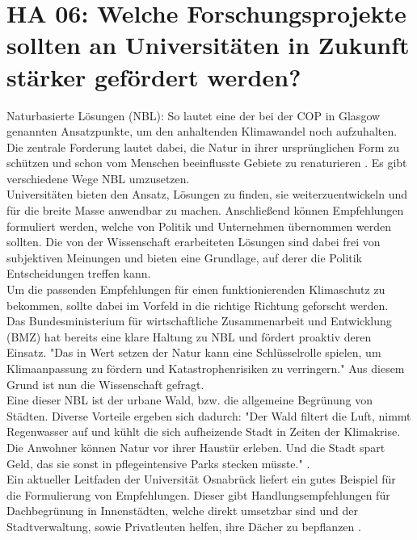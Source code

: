 \section{HA 06: Welche Forschungsprojekte sollten an Universitäten in Zukunft stärker gefördert werden?}
  Naturbasierte Lösungen (NBL): So lautet eine der bei der COP in Glasgow genannten Ansatzpunkte, um den anhaltenden Klimawandel noch aufzuhalten. Die zentrale Forderung lautet dabei, die Natur in ihrer ursprünglichen Form zu schützen und schon vom Menschen beeinflusste Gebiete zu renaturieren \cite{wahnbaeck_nature-based_2021}. Es gibt verschiedene Wege NBL umzusetzen.\\
  Universitäten bieten den Ansatz, Lösungen zu finden, sie weiterzuentwickeln und für die breite Masse anwendbar zu machen. Anschließend können Empfehlungen formuliert werden, welche von Politik und Unternehmen übernommen werden sollten. Die von der Wissenschaft erarbeiteten Lösungen sind dabei frei von subjektiven Meinungen und bieten eine Grundlage, auf derer die Politik Entscheidungen treffen kann.\\
  Um die passenden Empfehlungen für einen funktionierenden Klimaschutz zu bekommen, sollte dabei im Vorfeld in die richtige Richtung geforscht werden.\\
  Das Bundesministerium für wirtschaftliche Zusammenarbeit und Entwicklung (BMZ) hat bereits eine klare Haltung zu NBL und fördert proaktiv deren Einsatz. "Das in Wert setzen der Natur kann eine Schlüsselrolle spielen, um Klimaanpassung zu fördern und Katastrophenrisiken zu verringern." \cite{bundesministerium_fur_wirtschaftliche_zusammenarbeit_und_entwicklung_naturbasierte_2021} Aus diesem Grund ist nun die Wissenschaft gefragt.\\
  Eine dieser NBL ist der urbane Wald, bzw. die allgemeine Begrünung von Städten. Diverse Vorteile ergeben sich dadurch: "Der Wald filtert die Luft, nimmt Regenwasser auf und kühlt die sich aufheizende Stadt in Zeiten der Klimakrise. Die Anwohner können Natur vor ihrer Haustür erleben. Und die Stadt spart Geld, das sie sonst in pflegeintensive Parks stecken müsste." \cite{wahnbaeck_nature-based_2021}.\\
  Ein aktueller Leitfaden der Universität Osnabrück liefert ein gutes Beispiel für die Formulierung von Empfehlungen. Dieser gibt Handlungsempfehlungen für Dachbegrünung in Innenstädten, welche direkt umsetzbar sind und der Stadtverwaltung, sowie Privatleuten helfen, ihre Dächer zu bepflanzen \cite{schroder_extensive_2020}.\\
